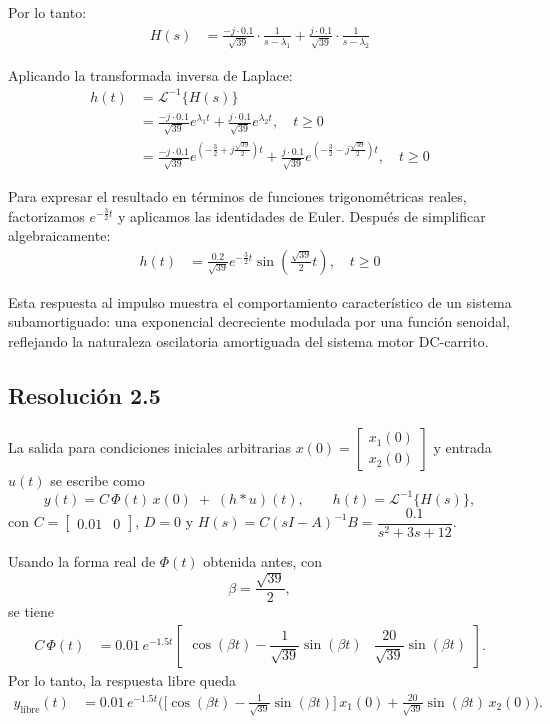 \documentclass[
  11pt,
  letterpaper,
   addpoints,
   answers
  ]{exam}
\begin{document}
\begin{solution}
Por lo tanto:
\begin{align}
H(s) &= \frac{-j \cdot 0.1}{\sqrt{39}} \cdot \frac{1}{s-\lambda_1} + \frac{j \cdot 0.1}{\sqrt{39}} \cdot \frac{1}{s-\lambda_2}
\end{align}

Aplicando la transformada inversa de Laplace:
\begin{align}
h(t) &= \mathcal{L}^{-1}\{H(s)\} \\
&= \frac{-j \cdot 0.1}{\sqrt{39}} e^{\lambda_1 t} + \frac{j \cdot 0.1}{\sqrt{39}} e^{\lambda_2 t}, \quad t \geq 0 \\
&= \frac{-j \cdot 0.1}{\sqrt{39}} e^{\left(-\frac{3}{2}+j\frac{\sqrt{39}}{2}\right)t} + \frac{j \cdot 0.1}{\sqrt{39}} e^{\left(-\frac{3}{2}-j\frac{\sqrt{39}}{2}\right)t}, \quad t \geq 0
\end{align}

Para expresar el resultado en términos de funciones trigonométricas reales, factorizamos $e^{-\frac{3}{2}t}$ y aplicamos las identidades de Euler. Después de simplificar algebraicamente:
\begin{align}
h(t) &= \frac{0.2}{\sqrt{39}} e^{-\frac{3}{2}t} \sin\left(\frac{\sqrt{39}}{2}t\right), \quad t \geq 0
\end{align}

Esta respuesta al impulso muestra el comportamiento característico de un sistema subamortiguado: una exponencial decreciente modulada por una función senoidal, reflejando la naturaleza oscilatoria amortiguada del sistema motor DC-carrito.
\subsection*{Resolución 2.5}

La salida para condiciones iniciales arbitrarias $x(0)=\begin{bmatrix}x_1(0)\\ x_2(0)\end{bmatrix}$ y entrada $u(t)$ se escribe como
\begin{equation}
y(t)=C\,\Phi(t)\,x(0)\;+\;(h*u)(t),\qquad h(t)=\mathcal{L}^{-1}\!\{H(s)\},
\end{equation}
con $C=\begin{bmatrix}0.01&0\end{bmatrix}$, $D=0$ y $H(s)=C(sI-A)^{-1}B=\dfrac{0.1}{s^2+3s+12}$.

Usando la forma real de $\Phi(t)$ obtenida antes, con
\[
\beta=\frac{\sqrt{39}}{2},
\]
se tiene
\begin{align}
C\,\Phi(t)
&=0.01\,e^{-1.5t}\!
\begin{bmatrix}
\cos(\beta t)-\dfrac{1}{\sqrt{39}}\sin(\beta t) &
\dfrac{20}{\sqrt{39}}\sin(\beta t)
\end{bmatrix}.
\end{align}
Por lo tanto, la respuesta libre queda
\begin{align}
y_{\text{libre}}(t)
&=0.01\,e^{-1.5t}
\Bigg(
\Big[\cos(\beta t)-\frac{1}{\sqrt{39}}\sin(\beta t)\Big]\,x_1(0)
+\frac{20}{\sqrt{39}}\sin(\beta t)\,x_2(0)
\Bigg).
\end{align}


\end{solution}
\end{document}

